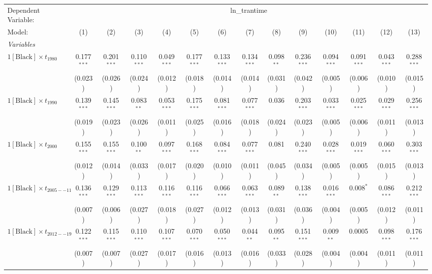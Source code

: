 \begin{tabular}{lccccccccccccc}
\tabularnewline\midrule\midrule
Dependent Variable:&\multicolumn{13}{c}{ln\_trantime}\\
Model:&(1) & (2) & (3) & (4) & (5) & (6) & (7) & (8) & (9) & (10) & (11) & (12) & (13)\\
\midrule \emph{Variables}&   &   &   &   &   &   &   &   &   &   &   &   &  \\
$1[\text{Black}] \times t_{1980}$ & 0.177$^{***}$ & 0.201$^{***}$ & 0.110$^{***}$ & 0.049$^{***}$ & 0.177$^{***}$ & 0.133$^{***}$ & 0.134$^{***}$ & 0.098$^{**}$ & 0.236$^{***}$ & 0.094$^{***}$ & 0.091$^{***}$ & 0.043$^{***}$ & 0.288$^{***}$\\
  &(0.023) & (0.026) & (0.024) & (0.012) & (0.018) & (0.014) & (0.014) & (0.031) & (0.042) & (0.005) & (0.006) & (0.010) & (0.015)\\
$1[\text{Black}] \times t_{1990}$ & 0.139$^{***}$ & 0.145$^{***}$ & 0.083$^{**}$ & 0.053$^{***}$ & 0.175$^{***}$ & 0.081$^{***}$ & 0.077$^{***}$ & 0.036 & 0.203$^{***}$ & 0.033$^{***}$ & 0.025$^{***}$ & 0.029$^{***}$ & 0.256$^{***}$\\
  &(0.019) & (0.023) & (0.026) & (0.011) & (0.025) & (0.016) & (0.018) & (0.024) & (0.023) & (0.005) & (0.006) & (0.011) & (0.013)\\
$1[\text{Black}] \times t_{2000}$ & 0.155$^{***}$ & 0.155$^{***}$ & 0.100$^{**}$ & 0.097$^{***}$ & 0.168$^{***}$ & 0.084$^{***}$ & 0.077$^{***}$ & 0.081 & 0.240$^{***}$ & 0.028$^{***}$ & 0.019$^{***}$ & 0.060$^{***}$ & 0.303$^{***}$\\
  &(0.012) & (0.014) & (0.033) & (0.017) & (0.020) & (0.010) & (0.011) & (0.045) & (0.034) & (0.005) & (0.005) & (0.015) & (0.013)\\
$1[\text{Black}] \times t_{2005--11}$ & 0.136$^{***}$ & 0.129$^{***}$ & 0.113$^{***}$ & 0.116$^{***}$ & 0.116$^{***}$ & 0.066$^{***}$ & 0.063$^{***}$ & 0.089$^{**}$ & 0.138$^{***}$ & 0.016$^{***}$ & 0.008$^{*}$ & 0.086$^{***}$ & 0.212$^{***}$\\
  &(0.007) & (0.006) & (0.027) & (0.018) & (0.027) & (0.012) & (0.013) & (0.031) & (0.036) & (0.004) & (0.005) & (0.012) & (0.011)\\
$1[\text{Black}] \times t_{2012--19}$ & 0.122$^{***}$ & 0.115$^{***}$ & 0.110$^{***}$ & 0.107$^{***}$ & 0.070$^{***}$ & 0.050$^{***}$ & 0.044$^{**}$ & 0.095$^{**}$ & 0.151$^{***}$ & 0.009$^{**}$ & 0.0005 & 0.098$^{***}$ & 0.176$^{***}$\\
  &(0.007) & (0.007) & (0.027) & (0.017) & (0.016) & (0.013) & (0.016) & (0.033) & (0.028) & (0.004) & (0.004) & (0.011) & (0.011)\\

\end{tabular}
